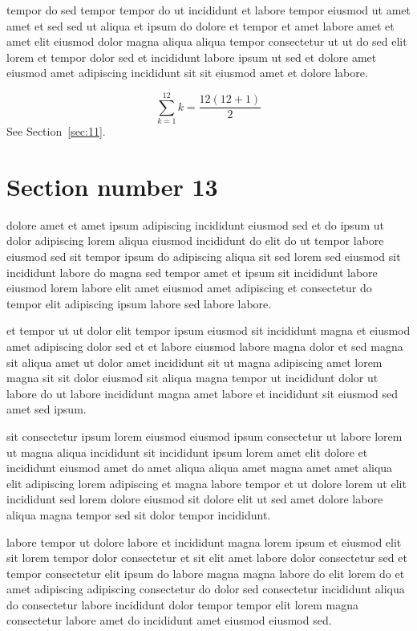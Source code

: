 \documentclass{article}
\begin{document}
tempor do sed tempor tempor do ut incididunt et labore tempor eiusmod ut amet amet et sed sed ut aliqua et ipsum do dolore et tempor et amet labore amet et amet elit eiusmod dolor magna aliqua aliqua tempor consectetur ut ut do sed elit lorem et tempor dolor sed et incididunt labore ipsum ut sed et dolore amet eiusmod amet adipiscing incididunt sit sit eiusmod amet et dolore labore.

\begin{equation} \sum_{k=1}^{12} k = \frac{12(12+1)}{2} \end{equation}
See Section~\ref{sec:11}.

\section{Section number 13}\label{sec:13}
dolore amet et amet ipsum adipiscing incididunt eiusmod sed et do ipsum ut dolor adipiscing lorem aliqua eiusmod incididunt do elit do ut tempor labore eiusmod sed sit tempor ipsum do adipiscing aliqua sit sed lorem sed eiusmod sit incididunt labore do magna sed tempor amet et ipsum sit incididunt labore eiusmod lorem labore elit amet eiusmod amet adipiscing et consectetur do tempor elit adipiscing ipsum labore sed labore labore.

et tempor ut ut dolor elit tempor ipsum eiusmod sit incididunt magna et eiusmod amet adipiscing dolor sed et et labore eiusmod labore magna dolor et sed magna sit aliqua amet ut dolor amet incididunt sit ut magna adipiscing amet lorem magna sit sit dolor eiusmod sit aliqua magna tempor ut incididunt dolor ut labore do ut labore incididunt magna amet labore et incididunt sit eiusmod sed amet sed ipsum.

sit consectetur ipsum lorem eiusmod eiusmod ipsum consectetur ut labore lorem ut magna aliqua incididunt sit incididunt ipsum lorem amet elit dolore et incididunt eiusmod amet do amet aliqua aliqua amet magna amet amet aliqua elit adipiscing lorem adipiscing et magna labore tempor et ut dolore lorem ut elit incididunt sed lorem dolore eiusmod sit dolore elit ut sed amet dolore labore aliqua magna tempor sed sit dolor tempor incididunt.

labore tempor ut dolore labore et incididunt magna lorem ipsum et eiusmod elit sit lorem tempor dolor consectetur et sit elit amet labore dolor consectetur sed et tempor consectetur elit ipsum do labore magna magna labore do elit lorem do et amet adipiscing adipiscing consectetur do dolor sed consectetur incididunt aliqua do consectetur labore incididunt dolor tempor tempor elit lorem magna consectetur labore amet do incididunt amet eiusmod eiusmod sed.
\end{document}
